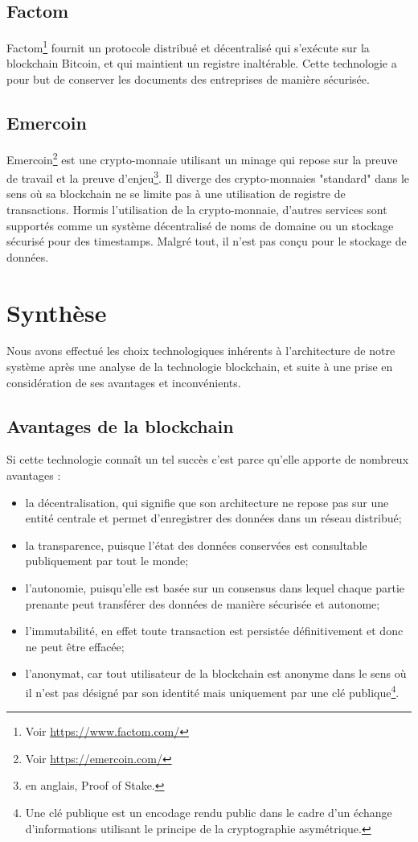 \documentclass{tnreport}
\begin{document}
\subsection{Factom}

Factom\footnote{Voir \url{https://www.factom.com/}} fournit un protocole distribué et décentralisé qui s'exécute sur la blockchain Bitcoin, et qui maintient un registre inaltérable. Cette technologie a pour but de conserver les documents des entreprises de manière sécurisée.

\subsection{Emercoin}

Emercoin\footnote{Voir \url{https://emercoin.com/}} est une crypto-monnaie utilisant un minage qui repose sur la preuve de travail et la preuve d'enjeu\footnote{en anglais, Proof of Stake.}. Il diverge des crypto-monnaies "standard" dans le sens où sa blockchain ne se limite pas à une utilisation de registre de transactions. Hormis l'utilisation de la crypto-monnaie, d'autres services sont supportés comme un système décentralisé de noms de domaine ou un stockage sécurisé pour des timestamps. Malgré tout, il n'est pas conçu pour le stockage de données.

\section{Synthèse}

Nous avons effectué les choix technologiques inhérents à l'architecture de notre système après une analyse de la technologie blockchain, et suite à une prise en considération de ses avantages et inconvénients.

\subsection{Avantages de la blockchain}

Si cette technologie connaît un tel succès c'est parce qu'elle apporte de nombreux avantages : 
\begin{itemize}
	\item la décentralisation, qui signifie que son architecture ne repose pas sur une entité centrale et permet d'enregistrer des données dans un réseau distribué; 
	\item la transparence, puisque l'état des données conservées est consultable publiquement par tout le monde; 
	\item l'autonomie, puisqu'elle est basée sur un consensus dans lequel chaque partie prenante peut transférer des données de manière sécurisée et autonome;
	\item l'immutabilité, en effet toute transaction est persistée définitivement et donc ne peut être effacée;
	\item l'anonymat, car tout utilisateur de la blockchain est anonyme dans le sens où il n'est pas désigné par son identité mais uniquement par une clé publique\footnote{Une clé publique est un encodage rendu public dans le cadre d'un échange d'informations utilisant le principe de la cryptographie asymétrique.}.
\end{itemize}
\end{document}
